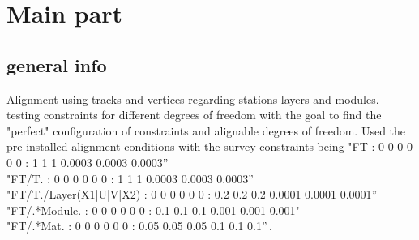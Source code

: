 \chapter{Main part}
\label{sec:story}


\section{general info}

Alignment using tracks and vertices regarding stations layers and modules. testing constraints for different degrees of freedom with the goal to find the "perfect" configuration of constraints and alignable degrees of freedom.
Used the pre-installed alignment conditions with the survey constraints being
"FT : 0 0 0 0 0 0 : 1 1 1 0.0003 0.0003 0.0003”\\
"FT/T. : 0 0 0 0 0 0 : 1 1 1 0.0003 0.0003 0.0003”\\
"FT/T./Layer(X1|U|V|X2) : 0 0 0 0 0 0 : 0.2 0.2 0.2 0.0001 0.0001 0.0001”\\
"FT/.*Module. : 0 0 0 0 0 0 : 0.1 0.1 0.1 0.001 0.001 0.001"\\
"FT/.*Mat. : 0 0 0 0 0 0 : 0.05 0.05 0.05 0.1 0.1 0.1”\,.

